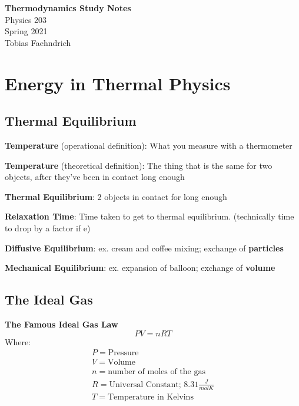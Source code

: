 \documentclass[11pt]{article}
\theoremstyle{definition}
\begin{document}
\thispagestyle{empty}

\begin{center}
{\LARGE \bf Thermodynamics Study Notes}\\
{\large Physics 203}\\
Spring 2021\\
Tobias Faehndrich
\end{center}
\section{Energy in Thermal Physics}


\subsection{Thermal Equilibrium}
\textbf{Temperature} (operational definition): What you measure with a thermometer

\textbf{Temperature} (theoretical definition): The thing that is the same for two objects, after they've been in contact long enough

\textbf{Thermal Equilibrium}: 2 objects in contact for long enough

\textbf{Relaxation Time}: Time taken to get to thermal equilibrium. (technically time to drop by a factor if e)

\textbf{Diffusive Equilibrium}: ex. cream and coffee mixing; exchange of \textbf{particles}

\textbf{Mechanical Equilibrium}: ex. expansion of balloon; exchange of \textbf{volume}

\subsection{The Ideal Gas}
\begin{shaded}
\textbf{The Famous Ideal Gas Law} \newline
\begin{equation}
PV = nRT
\end{equation}
Where:
\begin{equation*}
\begin{split}
P = \text{Pressure} \\
V = \text{Volume} \\
n = \text{number of moles of the gas}\\
R = \text{Universal Constant; 8.31}\frac{J}{mol K}\\
T = \text{Temperature in Kelvins}
\end{split}
\end{equation*}
\end{shaded}
\end{document}
